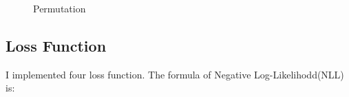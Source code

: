 \documentclass{article}
\begin{document}
\begin{figure}[htbp]
\centering
{}
\quad
\quad
{}
\caption{Permutation}
\label{permutation}
\end{figure}

\subsection{Loss Function}
I implemented four loss function. The formula of Negative Log-Likelihodd(NLL) is:
\end{document}
